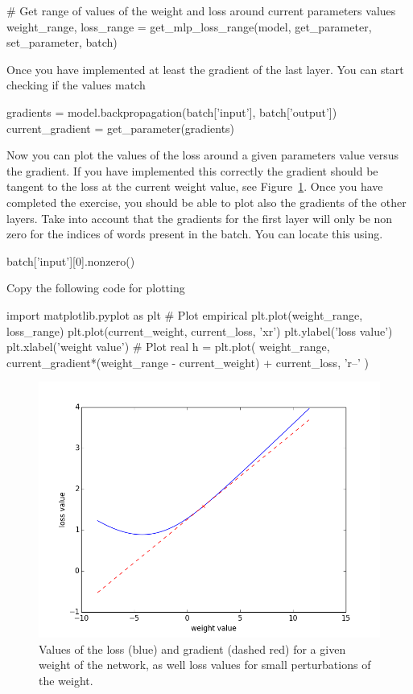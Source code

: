 \begin{exercise}
\begin{python}
# Get range of values of the weight and loss around current parameters values
weight_range, loss_range = get_mlp_loss_range(model, get_parameter, set_parameter, batch)
\end{python}
Once you have implemented at least the gradient of the last layer. You can
start checking if the values match
\begin{python}
gradients = model.backpropagation(batch['input'], batch['output'])
current_gradient = get_parameter(gradients)
\end{python}
Now you can plot the values of the loss around a given parameters value versus the gradient. If you have implemented this correctly the gradient should be tangent to the loss at the current weight value, see Figure~\ref{fig:lossandgradient}. Once you have completed the exercise, you should be able to plot also the gradients of the other layers. Take into account that the gradients for the first layer will only be non zero for the indices of words present in the batch. You can locate this using.
\begin{python}
batch['input'][0].nonzero()
\end{python}
Copy the following code for plotting
\begin{python}
import matplotlib.pyplot as plt
# Plot empirical
plt.plot(weight_range, loss_range)
plt.plot(current_weight, current_loss, 'xr')
plt.ylabel('loss value')
plt.xlabel('weight value')
# Plot real
h = plt.plot(
    weight_range,
    current_gradient*(weight_range - current_weight) + current_loss,
    'r--'
)
\end{python}
\begin{figure}[!hb]
\centering
\includegraphics[scale=0.6]{figs/deep_learning/lossandgradient.png}
\caption{Values of the loss (blue) and gradient (dashed red) for a given weight of the network, as well loss values for small perturbations of the weight.}
\label{fig:lossandgradient}
\end{figure}


\end{exercise}
